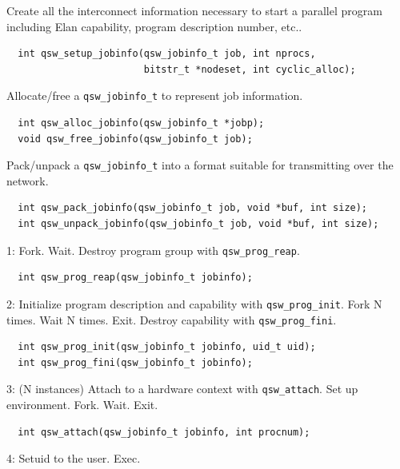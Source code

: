 \documentclass[letter,landscape]{seminar}
\begin{document}
\begin{slide}
  \small
  Create all the interconnect information necessary to start a parallel
  program including Elan capability, program description number, etc..
  \begin{verbatim}
  int qsw_setup_jobinfo(qsw_jobinfo_t job, int nprocs,
                        bitstr_t *nodeset, int cyclic_alloc);
  \end{verbatim}
  Allocate/free a {\tt qsw\_jobinfo\_t} to represent job information.
  \begin{verbatim}
  int qsw_alloc_jobinfo(qsw_jobinfo_t *jobp);
  void qsw_free_jobinfo(qsw_jobinfo_t job);
  \end{verbatim}
  Pack/unpack a {\tt qsw\_jobinfo\_t} into a format suitable for transmitting
  over the network.
  \begin{verbatim}
  int qsw_pack_jobinfo(qsw_jobinfo_t job, void *buf, int size);
  int qsw_unpack_jobinfo(qsw_jobinfo_t job, void *buf, int size);
  \end{verbatim}
\end{slide}


\begin{slide}
  \small
  1: Fork.  Wait.  Destroy program group with {\tt qsw\_prog\_reap}.
  \begin{verbatim}
  int qsw_prog_reap(qsw_jobinfo_t jobinfo);
  \end{verbatim}
  2: Initialize program description and capability with {\tt qsw\_prog\_init}.
  Fork N times.  Wait N times.  Exit. Destroy capability with {\tt qsw\_prog\_fini}.
  \begin{verbatim}
  int qsw_prog_init(qsw_jobinfo_t jobinfo, uid_t uid);
  int qsw_prog_fini(qsw_jobinfo_t jobinfo);
  \end{verbatim}
  3: (N instances) Attach to a hardware context with {\tt qsw\_attach}.
  Set up environment.  Fork.  Wait.  Exit.
  \begin{verbatim}
  int qsw_attach(qsw_jobinfo_t jobinfo, int procnum);
  \end{verbatim}
  4: Setuid to the user.  Exec.
\end{slide}
\end{document}
